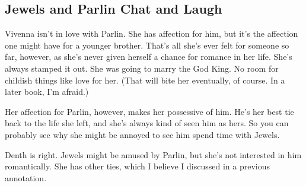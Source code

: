\subsection*{Jewels and Parlin Chat and Laugh}

Vivenna isn’t in love with Parlin. She has affection for him, but it’s the affection one might have for a younger brother. That’s all she’s ever felt for someone so far, however, as she’s never given herself a chance for romance in her life. She’s always stamped it out. She was going to marry the God King. No room for childish things like love for her. (That will bite her eventually, of course. In a later book, I’m afraid.)

Her affection for Parlin, however, makes her possessive of him. He’s her best tie back to the life she left, and she’s always kind of seen him as hers. So you can probably see why she might be annoyed to see him spend time with Jewels.

Denth is right. Jewels might be amused by Parlin, but she’s not interested in him romantically. She has other ties, which I believe I discussed in a previous annotation.




